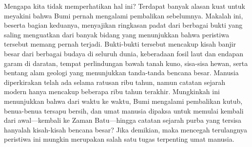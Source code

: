 \documentclass[10pt,twocolumn,letterpaper]{article}
\begin{document}
Mengapa kita tidak memperhatikan hal ini? Terdapat banyak alasan kuat untuk meyakini bahwa Bumi pernah mengalami pembalikan sebelumnya. Makalah ini, beserta bagian keduanya, menyajikan ringkasan padat dari berbagai bukti yang saling menguatkan dari banyak bidang yang menunjukkan bahwa peristiwa tersebut memang pernah terjadi. Bukti-bukti tersebut mencakup kisah banjir besar dari berbagai budaya di seluruh dunia, keberadaan fosil laut dan endapan garam di daratan, tempat perlindungan bawah tanah kuno, sisa-sisa hewan, serta bentang alam geologi yang menunjukkan tanda-tanda bencana besar. Manusia diperkirakan telah ada selama ratusan ribu tahun, namun catatan sejarah modern hanya mencakup beberapa ribu tahun terakhir. Mungkinkah ini menunjukkan bahwa dari waktu ke waktu, Bumi mengalami pembalikan kutub, benua-benua tersapu bersih, dan umat manusia dipaksa untuk memulai kembali dari awal—kembali ke Zaman Batu—hingga catatan sejarah purba yang tersisa hanyalah kisah-kisah bencana besar? Jika demikian, maka mencegah terulangnya peristiwa ini mungkin merupakan salah satu tugas terpenting umat manusia.
\end{document}
